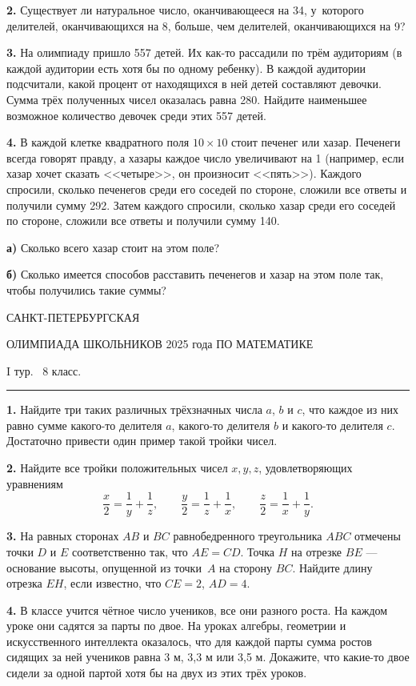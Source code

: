 \documentclass[12pt,a4paper]{article}
\def\q#1.{{\bf #1. }}
\begin{document}
\q2. Существует ли натуральное число, оканчивающееся на 34, у~которого делителей, оканчивающихся на 8, больше, чем делителей, оканчивающихся на 9?

\q3. На олимпиаду пришло 557 детей.  Их как-то рассадили по трём аудиториям (в каждой аудитории есть хотя бы по одному ребенку). В каждой аудитории подсчитали, какой процент от находящихся в ней детей составляют девочки. Сумма трёх полученных чисел оказалась равна 280. Найдите наименьшее возможное количество девочек среди этих 557 детей.

\q4. В каждой клетке квадратного поля $10\times 10$ стоит печенег или хазар. Печенеги всегда говорят правду, а хазары каждое число увеличивают на 1 (например, если хазар хочет сказать <<четыре>>, он произносит <<пять>>). Каждого спросили, сколько печенегов среди его соседей по стороне, сложили все ответы и получили сумму 292. Затем каждого спросили, сколько хазар среди его соседей по стороне, сложили все ответы и получили сумму 140. 

\hskip10pt
{\bf а)} Сколько всего хазар стоит на этом поле? 

\hskip10pt
{\bf б)} Сколько имеется способов расставить печенегов и хазар на этом поле так, чтобы получились такие суммы?


\clearpage

\centerline{\sc САНКТ-ПЕТЕРБУРГСКАЯ}
\centerline{\sc ОЛИМПИАДА ШКОЛЬНИКОВ 2025 года ПО МАТЕМАТИКЕ}
\centerline{\sc I тур. \ 8 класс.}
\medskip
\hrule
\bigskip

\q1. Найдите три таких различных трёхзначных числа $a$, $b$ и $c$, что каждое из них равно сумме какого-то делителя $a$, какого-то делителя $b$ и какого-то делителя $c$. Достаточно привести один пример такой тройки чисел.

\q2. Найдите все тройки положительных чисел $x, y, z$, удовлетворяющих уравнениям
$$
\frac x2=\frac1y+\frac 1z,\qquad  \frac y2=\frac1z+\frac 1x,\qquad \frac z2=\frac1x+\frac1y.
$$

\q3. На равных сторонах $AB$ и $BC$ равнобедренного треугольника $ABC$ отмечены точки $D$ и $E$ соответственно так, что $AE = CD$. Точка $H$ на отрезке $BE$ — основание высоты, опущенной из точки~$A$ на сторону $BC$. Найдите длину отрезка $EH$, если известно, что $CE = 2$, $AD = 4$.

\q4. В классе учится чётное число учеников, все они разного роста. На каждом уроке они садятся за парты по двое. На уроках алгебры, геометрии и искусственного интеллекта оказалось, что для каждой парты сумма ростов сидящих за ней учеников равна 3 м, 3,3 м или 3,5 м. Докажите, что какие-то двое сидели за одной партой хотя бы на двух из этих трёх уроков. 
\end{document}
